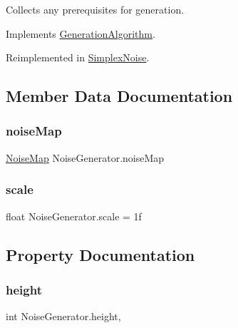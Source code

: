 Collects any prerequisites for generation. 



Implements \mbox{\hyperlink{class_generation_algorithm_a5e891b08f0c1d8f4ccc9ad06667691ec}{Generation\+Algorithm}}.



Reimplemented in \mbox{\hyperlink{class_simplex_noise_a43164ec5960921789ce75e83651717cf}{Simplex\+Noise}}.



\subsection{Member Data Documentation}
\mbox{\label{class_noise_generator_a19e92d7669706bdd2cae8229dc6331f4}} 
\subsubsection{\texorpdfstring{noise\+Map}{noiseMap}}
{\footnotesize\ttfamily \mbox{\hyperlink{class_noise_map}{Noise\+Map}} Noise\+Generator.\+noise\+Map}

\mbox{\label{class_noise_generator_a411009c00c7e62e99dccd0dd3b98c661}} 
\subsubsection{\texorpdfstring{scale}{scale}}
{\footnotesize\ttfamily float Noise\+Generator.\+scale = 1f}



\subsection{Property Documentation}
\mbox{\label{class_noise_generator_a73fd14bf579ffcf3118b81be3107c0d5}} 
\subsubsection{\texorpdfstring{height}{height}}
{\footnotesize\ttfamily int Noise\+Generator.\+height\hspace{0.3cm}{\ttfamily [get]}, {\ttfamily [set]}}

